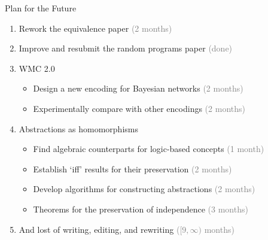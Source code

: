 \documentclass{beamer}
\begin{document}
\begin{frame}{Plan for the Future}
  \begin{enumerate}
  \item Rework the equivalence paper \textcolor{gray}{(2 months)}
  \item Improve and resubmit the random programs paper \textcolor{gray}{(done)}
  \item WMC 2.0
    \begin{itemize}
    \item Design a new encoding for Bayesian networks \textcolor{gray}{(2 months)}
    \item Experimentally compare with other encodings \textcolor{gray}{(2 months)}
    \end{itemize}
  \item Abstractions as homomorphisms
    \begin{itemize}
    \item Find algebraic counterparts for logic-based concepts \textcolor{gray}{(1 month)}
    \item Establish `iff' results for their preservation \textcolor{gray}{(2 months)}
    \item Develop algorithms for constructing abstractions \textcolor{gray}{(2 months)}
    \item Theorems for the preservation of independence \textcolor{gray}{(3 months)}
    \end{itemize}
  \item And lost of writing, editing, and rewriting \textcolor{gray}{($[9, \infty)$ months)}
  \end{enumerate}
\end{frame}
\end{document}
